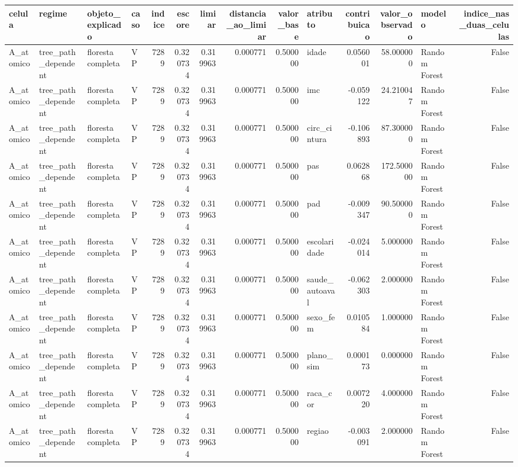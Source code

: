 \begin{tabular}{llllrrrrrlrrlr}
\toprule
celula & regime & objeto_explicado & caso & indice & escore & limiar & distancia_ao_limiar & valor_base & atributo & contribuicao & valor_observado & modelo & indice_nas_duas_celulas \\
\midrule
A_atomico & tree_path_dependent & floresta completa & VP & 7289 & 0.320734 & 0.319963 & 0.000771 & 0.500000 & idade & 0.056001 & 58.000000 & Random Forest & False \\
A_atomico & tree_path_dependent & floresta completa & VP & 7289 & 0.320734 & 0.319963 & 0.000771 & 0.500000 & imc & -0.059122 & 24.210047 & Random Forest & False \\
A_atomico & tree_path_dependent & floresta completa & VP & 7289 & 0.320734 & 0.319963 & 0.000771 & 0.500000 & circ_cintura & -0.106893 & 87.300000 & Random Forest & False \\
A_atomico & tree_path_dependent & floresta completa & VP & 7289 & 0.320734 & 0.319963 & 0.000771 & 0.500000 & pas & 0.062868 & 172.500000 & Random Forest & False \\
A_atomico & tree_path_dependent & floresta completa & VP & 7289 & 0.320734 & 0.319963 & 0.000771 & 0.500000 & pad & -0.009347 & 90.500000 & Random Forest & False \\
A_atomico & tree_path_dependent & floresta completa & VP & 7289 & 0.320734 & 0.319963 & 0.000771 & 0.500000 & escolaridade & -0.024014 & 5.000000 & Random Forest & False \\
A_atomico & tree_path_dependent & floresta completa & VP & 7289 & 0.320734 & 0.319963 & 0.000771 & 0.500000 & saude_autoaval & -0.062303 & 2.000000 & Random Forest & False \\
A_atomico & tree_path_dependent & floresta completa & VP & 7289 & 0.320734 & 0.319963 & 0.000771 & 0.500000 & sexo_fem & 0.010584 & 1.000000 & Random Forest & False \\
A_atomico & tree_path_dependent & floresta completa & VP & 7289 & 0.320734 & 0.319963 & 0.000771 & 0.500000 & plano_sim & 0.000173 & 0.000000 & Random Forest & False \\
A_atomico & tree_path_dependent & floresta completa & VP & 7289 & 0.320734 & 0.319963 & 0.000771 & 0.500000 & raca_cor & 0.007220 & 4.000000 & Random Forest & False \\
A_atomico & tree_path_dependent & floresta completa & VP & 7289 & 0.320734 & 0.319963 & 0.000771 & 0.500000 & regiao & -0.003091 & 2.000000 & Random Forest & False \\

\end{tabular}
